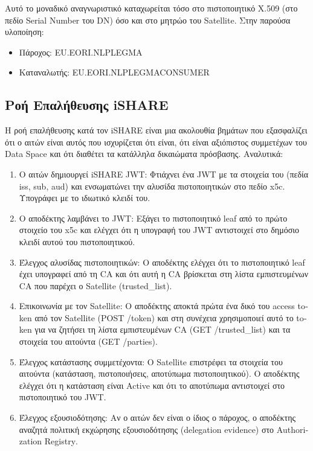 Αυτό το μοναδικό αναγνωριστικό καταχωρείται τόσο στο πιστοποιητικό
\textlatin{X.509} (στο πεδίο \textlatin{Serial Number} του \textlatin{DN})
όσο και στο μητρώο του \textlatin{Satellite}. Στην παρούσα υλοποίηση:
\begin{itemize}
    \item Πάροχος: \textlatin{EU.EORI.NLPLEGMA}
    \item Καταναλωτής: \textlatin{EU.EORI.NLPLEGMACONSUMER}
\end{itemize}

\subsection{Ροή Επαλήθευσης \textlatin{iSHARE} }
\label{subsec:ishare-flow-detail}

Η ροή επαλήθευσης κατά τον \textlatin{iSHARE} είναι μια ακολουθία
βημάτων που εξασφαλίζει ότι ο αιτών είναι αυτός που ισχυρίζεται
ότι είναι, ότι είναι αξιόπιστος συμμετέχων του \textlatin{Data
Space} και ότι διαθέτει τα κατάλληλα δικαιώματα πρόσβασης.
Αναλυτικά:

\begin{enumerate}
    \item Ο αιτών δημιουργεί \textlatin{iSHARE JWT}: Φτιάχνει
    ένα \textlatin{JWT} με τα στοιχεία του (πεδία \textlatin{iss},
    \textlatin{sub}, \textlatin{aud}) και ενσωματώνει την αλυσίδα
    πιστοποιητικών στο πεδίο \textlatin{x5c}. Υπογράφει με το ιδιωτικό
    κλειδί του.
    \item Ο αποδέκτης λαμβάνει το \textlatin{JWT}: Εξάγει
    το πιστοποιητικό \textlatin{leaf} από το πρώτο στοιχείο του
    \textlatin{x5c} και ελέγχει ότι η υπογραφή του \textlatin{JWT}
    αντιστοιχεί στο δημόσιο κλειδί αυτού του πιστοποιητικού.
    \item Έλεγχος αλυσίδας πιστοποιητικών: Ο αποδέκτης
    ελέγχει ότι το πιστοποιητικό \textlatin{leaf} έχει υπογραφεί
    από τη \textlatin{CA} και ότι αυτή η \textlatin{CA} βρίσκεται στη λίστα εμπιστευμένων
    \textlatin{CA} που παρέχει ο \textlatin{Satellite}
    (\textlatin{trusted\_list}).
    \item Επικοινωνία με τον \textlatin{Satellite}: Ο
    αποδέκτης αποκτά πρώτα ένα δικό του \textlatin{access token}
    από τον \textlatin{Satellite} (\textlatin{POST /token}) και στη
    συνέχεια χρησιμοποιεί αυτό το \textlatin{token} για να ζητήσει
    τη λίστα εμπιστευμένων \textlatin{CA}
    (\textlatin{GET /trusted\_list}) και τα στοιχεία του αιτούντα
    (\textlatin{GET /parties}).
    \item Έλεγχος κατάστασης συμμετέχοντα: Ο
    \textlatin{Satellite} επιστρέφει τα στοιχεία του αιτούντα
    (κατάσταση, πιστοποιήσεις, αποτύπωμα πιστοποιητικού). Ο
    αποδέκτης ελέγχει ότι η κατάσταση είναι \textlatin{Active} και
    ότι το αποτύπωμα αντιστοιχεί στο πιστοποιητικό του \textlatin{JWT}.
    \item Έλεγχος εξουσιοδότησης: Αν ο αιτών δεν είναι ο
    ίδιος ο πάροχος, ο αποδέκτης αναζητά πολιτική εκχώρησης
    εξουσιοδότησης (\textlatin{delegation evidence}) στο
    \textlatin{Authorization Registry}.
\end{enumerate}

